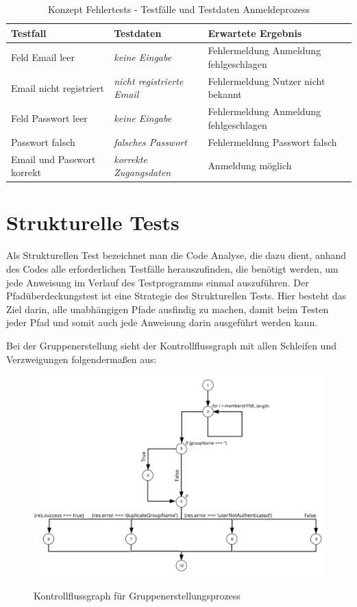 \begin{table}
\centering
\begin{tabular}{p{4.5cm}|p{4.5cm}|p{4.5cm}}
Testfall									& Testdaten												& Erwartete Ergebnis\\
\hline
Feld Email leer								& \emph{keine Eingabe}									& Fehlermeldung Anmeldung fehlgeschlagen\\
Email nicht registriert 					& \emph{nicht registrierte Email} 						& Fehlermeldung Nutzer nicht bekannt\\
Feld Passwort leer							& \emph{keine Eingabe}									& Fehlermeldung Anmeldung fehlgeschlagen\\
Passwort falsch 							& \emph{falsches Passwort} 								& Fehlermeldung Passwort falsch\\
Email und Passwort korrekt					& \emph{korrekte Zugangsdaten} 							& Anmeldung möglich\\

\end{tabular}
\label{tab:testing:fehlertest:anmeldung}
\caption{Konzept Fehlertests - Testfälle und Testdaten Anmeldeprozess}
\end{table}

\clearpage
\section{Strukturelle Tests}
Als Strukturellen Test bezeichnet man die Code Analyse, die dazu dient, anhand des Codes alle erforderlichen Testfälle herauszufinden, die benötigt werden, um jede Anweisung im Verlauf des Testprogramms einmal auszuführen.
Der Pfadüberdeckungstest ist eine Strategie des Strukturellen Tests. Hier besteht das Ziel darin, alle unabhängigen Pfade ausfindig zu machen, damit beim Testen jeder Pfad und somit auch jede Anweisung darin ausgeführt werden kann.

Bei der Gruppenerstellung sieht der Kontrollflussgraph mit allen Schleifen und Verzweigungen folgendermaßen aus:

\begin{figure}[!h]
\centering
\includegraphics[width=\textwidth]{images/text/strukturelle_tests.png}
\label{fig:strukturelle_tests}
\caption{Kontrollflussgraph für Gruppenerstellungsprozess}
\end{figure}

